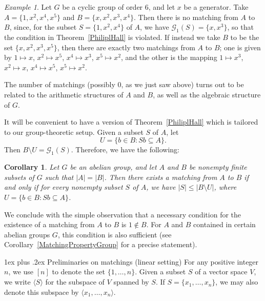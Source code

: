 \documentclass[11pt]{amsart}
\makeatletter
\def\subsection{\@startsection{subsection}{2}%
  \z@{1.5ex plus .2ex minus .2ex}%
  {1ex plus .2ex}%
  {\normalfont\bfseries}}
\newtheorem{corollary}[theorem]{Corollary}
\theoremstyle{definition}
\theoremstyle{remark}
\newtheorem{example}[theorem]{Example}
\makeatother
\begin{document}
\begin{example}
Let \( G \) be a cyclic group of order \( 6 \), and let \( x \) be a generator. Take \( A = \{ 1, x^2, x^4, x^5 \} \) and \( B = \{ x, x^2, x^3, x^4 \} \).  Then there is no matching from \( A \) to \( B \), since, for the subset \( S = \{ 1, x^2, x^4 \} \) of \( A \), we have \( \mathcal{G}_1(S) = \{ x, x^3 \} \), so that the condition in Theorem~\ref{PhiliplHall} is violated.  If instead we take \( B \) to be the set \( \{ x, x^2, x^3, x^5 \} \), then there are exactly two matchings from \( A \) to \( B \); one is given by \( 1 \mapsto x \), \( x^2 \mapsto x^5 \), \( x^4 \mapsto x^3 \), \( x^5 \mapsto x^2 \), and the other is the mapping \( 1 \mapsto x^3 \), \( x^2 \mapsto x \), \( x^4 \mapsto x^5 \), \( x^5 \mapsto x^2 \).
\end{example}


The number of matchings (possibly \( 0 \), as we just saw above) turns out to be related to the arithmetic structures of \( A \) and \( B \), as well as the algebraic structure of \( G \).  

It will be convenient to have a version of Theorem~\ref{PhiliplHall} which is tailored to our group-theoretic setup. Given a subset \( S \) of \( A \), let 
\[ U = \{ b \in B : Sb \subseteq A \}. \] 
Then \( B \setminus U = \mathcal{G}_1(S) \).  Therefore, we have the following:

\begin{corollary}  \label{RevisedPhilipHall}
Let \( G \) be an abelian group, and let \( A \) and \( B \) be nonempty finite subsets of \( G \) such that \( |A| = |B| \).  Then there exists a matching from \( A \) to \( B \) if and only if for every nonempty subset \( S \) of \( A \), we have \( |S| \leq |B \setminus U| \), where \( U = \{ b \in B : Sb \subseteq A \} \).
\end{corollary}

We conclude with the simple observation that a necessary condition for the existence of a matching from \( A \) to \( B \) is \( 1 \notin B \).  For \( A \) and \( B \) contained in certain abelian groups \( G \), this condition is also sufficient (see Corollary~\ref{MatchingPropertyGroup} for a precise statement). 


\bigskip


\subsection{Preliminaries on matchings (linear setting)}\label{linear sec}
For any positive integer \( n \), we use \( [n] \) to denote the set \( \{1, \ldots, n\} \). Given a subset \( S \) of a vector space \( V \), we write \( \langle S \rangle \) for the subspace of \( V \) spanned by \( S \).  If \( S = \{ x_1, \ldots , x_n \} \), we may also denote this subspace by \( \langle x_1,  \ldots , x_n \rangle \).
\end{document}
